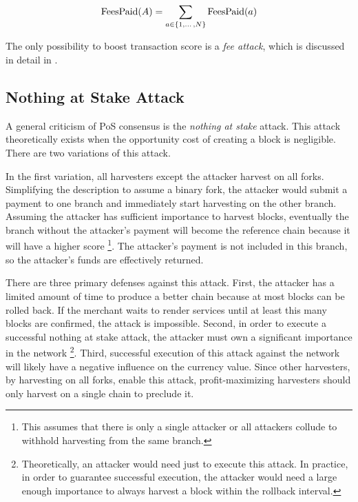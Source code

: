 \begin{equation}
	\mathrm{FeesPaid}(A) = \sum\limits_{a \in \{1, \dotso, N\}} \mathrm{FeesPaid}(a)
\end{equation}

The only possibility to boost transaction score is a \emph{fee attack}, which is discussed in detail in .

\subsection{Nothing at Stake Attack}

A general criticism of PoS consensus is the \emph{nothing at stake} attack.
This attack theoretically exists when the opportunity cost of creating a block is negligible.
There are two variations of this attack.

In the first variation, all harvesters except the attacker harvest on all forks.
Simplifying the description to assume a binary fork, the attacker would submit a payment to one branch and immediately start harvesting on the other branch.
Assuming the attacker has sufficient importance to harvest blocks, eventually the branch without the attacker's payment will become the reference chain because it will have a higher score
\footnote{This assumes that there is only a single attacker or all attackers collude to withhold harvesting from the same branch.}.
The attacker's payment is not included in this branch, so the attacker's funds are effectively returned.

There are three primary defenses against this attack.
First, the attacker has a limited amount of time to produce a better chain because at most  blocks can be rolled back.
If the merchant waits to render services until at least this many blocks are confirmed, the attack is impossible.
Second, in order to execute a successful nothing at stake attack, the attacker must own a significant importance in the network
\footnote{
	Theoretically, an attacker would need just  to execute this attack.
	In practice, in order to guarantee successful execution, the attacker would need a large enough importance to always harvest a block within the rollback interval.
}.
Third, successful execution of this attack against the network will likely have a negative influence on the currency value.
Since other harvesters, by harvesting on all forks, enable this attack, profit-maximizing harvesters should only harvest on a single chain to preclude it.

